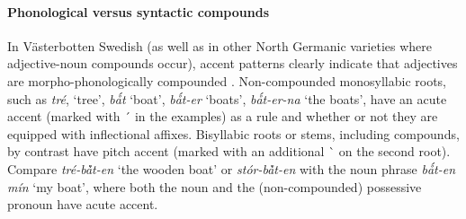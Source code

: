 \paragraph*{Phonological versus syntactic compounds}
In Västerbotten Swedish (as well as in other North Germanic varieties where adjective-noun compounds occur), accent patterns clearly indicate that adjectives are morpho-phonologically compounded \citep[cf.][]{dahl2003}. Non-compounded monosyllabic roots, such as \textit{tré}, ‘tree’, \textit{bǻt} ‘boat’, \textit{bǻt-er} ‘boats’, \textit{bǻt-er-na} ‘the boats’, have an acute accent (marked with ´ in the examples) as a rule and whether or not they are equipped with inflectional affixes. Bisyllabic roots or stems, including compounds, by contrast have pitch accent (marked with an additional \`{ } on the second root). Compare \textit{tré-bå̀t-en} ‘the wooden boat’ or \textit{stór-bå̀t-en} with the noun phrase \textit{bǻt-en mín} ‘my boat’, where both the noun and the (non-compounded) possessive pronoun have acute accent.

